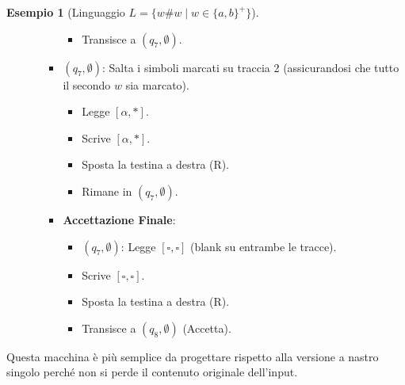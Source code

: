 \documentclass[a4paper]{article}
\theoremstyle{definition} %
\newtheorem{example}{Esempio}
\newcommand{\blankS}{\ensuremath{\square}}
\begin{document}
\begin{example}[Linguaggio $L = \{w\#w \mid w \in \{a,b\}^+\}$]
\begin{itemize}
\begin{itemize}
\begin{itemize}
\begin{itemize}
                            \item Transisce a $(q_7, \emptyset)$.
                        \end{itemize}
                    \item $(q_7, \emptyset)$: Salta i simboli marcati su traccia 2 (assicurandosi che tutto il secondo $w$ sia marcato).
                        \begin{itemize}
                            \item Legge $[\alpha, *]$.
                            \item Scrive $[\alpha, *]$.
                            \item Sposta la testina a destra (R).
                            \item Rimane in $(q_7, \emptyset)$.
                        \end{itemize}
                    \item \textbf{Accettazione Finale}:
                        \begin{itemize}
                            \item $(q_7, \emptyset)$: Legge $[\blankS, \blankS]$ (blank su entrambe le tracce).
                            \item Scrive $[\blankS, \blankS]$.
                            \item Sposta la testina a destra (R).
                            \item Transisce a $(q_8, \emptyset)$ (Accetta).
                        \end{itemize}
                \end{itemize}
        \end{itemize}
\end{itemize}
Questa macchina è più semplice da progettare rispetto alla versione a nastro singolo perché non si perde il contenuto originale dell'input.
\end{example}
\end{document}
